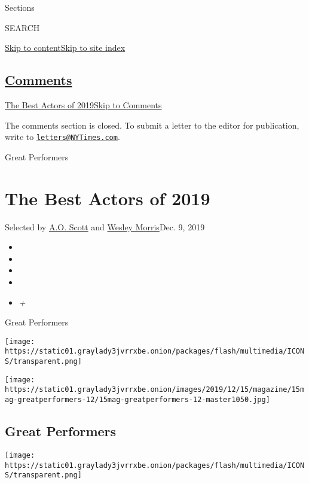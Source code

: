 Sections

SEARCH

\protect\hyperlink{site-content}{Skip to
content}\protect\hyperlink{site-index}{Skip to site index}

\hypertarget{comments}{%
\subsection{\texorpdfstring{\protect\hyperlink{commentsContainer}{Comments}}{Comments}}\label{comments}}

\href{}{The Best Actors of 2019}\href{}{Skip to Comments}

The comments section is closed. To submit a letter to the editor for
publication, write to
\href{mailto:letters@NYTimes.com}{\nolinkurl{letters@NYTimes.com}}.

Great Performers

\hypertarget{the-best-actors-of-2019}{%
\section{The Best Actors of 2019}\label{the-best-actors-of-2019}}

Selected by \href{https://www.nytimes3xbfgragh.onion/by/a-o--scott}{A.O.
Scott} and
\href{https://www.nytimes3xbfgragh.onion/by/wesley-morris}{Wesley
Morris}Dec. 9, 2019

\begin{itemize}
\item
\item
\item
\item
\item
  \emph{+}
\end{itemize}

Great Performers

\texttt{[image: https://static01.graylady3jvrrxbe.onion/packages/flash/multimedia/ICONS/transparent.png]}

\texttt{[image: https://static01.graylady3jvrrxbe.onion/images/2019/12/15/magazine/15mag-greatperformers-12/15mag-greatperformers-12-master1050.jpg]}

\hypertarget{great-performers}{%
\subsection{Great Performers}\label{great-performers}}

\texttt{[image: https://static01.graylady3jvrrxbe.onion/packages/flash/multimedia/ICONS/transparent.png]}

